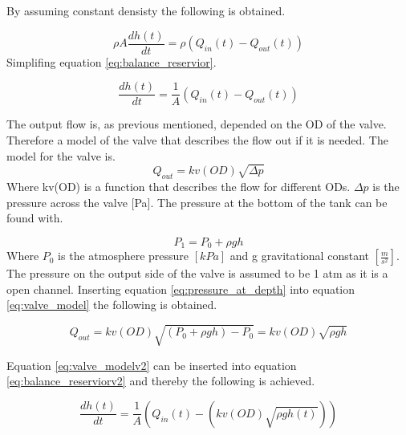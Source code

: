 By assuming constant densisty the following is obtained.

\begin{equation}\label{eq:balance_reservior}
	\rho A\frac{dh(t)}{dt}=\rho \left(Q_{in}(t)-Q_{out}(t)\right)
\end{equation}
Simplifing equation \ref{eq:balance_reservior}.

\begin{equation}\label{eq:balance_reserviorv2}
	\frac{dh(t)}{dt}=\frac{1}{A} \left(Q_{in}(t)-Q_{out}(t)\right)
\end{equation}

The output flow is, as previous mentioned, depended on the OD of the valve. Therefore a model of the valve that describes the flow out if it is needed. The model for the valve is.
\begin{equation}\label{eq:valve_model}
	Q_{out} = kv(OD) \sqrt{\Delta p}
\end{equation}
Where kv(OD) is a function that describes the flow for different ODs. $\Delta p$ is the pressure across the valve [Pa]. The pressure at the bottom of the tank can be found with.

\begin{equation}\label{eq:pressure_at_depth}
 	P_1 = P_0 +\rho g h
 \end{equation} 
 Where $P_0$ is the atmosphere pressure $[kPa]$ and g gravitational constant $\left[\frac{m}{s^2}\right]$. The pressure on the output side of the valve is assumed to be 1 atm as it is a open channel. Inserting equation \ref{eq:pressure_at_depth} into equation \ref{eq:valve_model} the following is obtained.    


\begin{equation}\label{eq:valve_modelv2}
	Q_{out} = kv(OD) \sqrt{(P_0 +\rho g h)- P_0} = kv(OD) \sqrt{\rho g h} 
\end{equation}

Equation \ref{eq:valve_modelv2} can be inserted into equation \ref{eq:balance_reserviorv2} and thereby the following is achieved.

\begin{equation}\label{eq:balance_reserviorv3}
	\frac{dh(t)}{dt}=\frac{1}{A} \left(Q_{in}(t)-\left(kv(OD) \sqrt{\rho g h(t)}\right)\right)
\end{equation}
